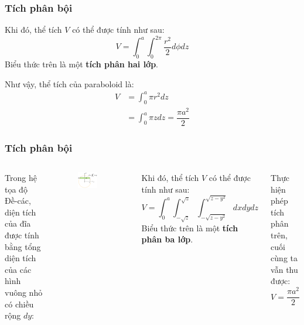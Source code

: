 \begin{frame}
\frametitle{Tích phân bội}
Khi đó, thể tích \(V\) có thể được tính như sau:
\begin{equation}
    V= \int_0^a \int_0^{2\pi} \dfrac{r^2}{2} d\phi dz
\end{equation}
Biểu thức trên là một \textbf{tích phân hai lớp}.

Như vậy, thể tích của paraboloid là:
\begin{equation}
    \begin{aligned}
    V&= \int_0^a \pi r^2 dz\\
    &= \int_0^a \pi z dz = \boxed{\dfrac{\pi a^2}{2}}
    \end{aligned}
\end{equation}
\end{frame}

\begin{frame}
\frametitle{Tích phân bội}
\begin{columns}
Trong hệ tọa độ Đề-các, diện tích của đĩa được tính bằng tổng diện tích của các hình vuông nhỏ có chiều rộng \(dy\):
\begin{figure}
    \centering
    \includegraphics[width=0.7\textwidth]{Content/Figure/descartesdisc.png}
\end{figure}
Khi đó, thể tích \(V\) có thể được tính như sau:
\begin{equation}
    V= \int_0^a \int_{-\sqrt{z}}^{\sqrt{z}} \int_{-\sqrt{z-y^2}}^{\sqrt{z-y^2}} dx dy dz
\end{equation}
Biểu thức trên là một \textbf{tích phân ba lớp}.

Thực hiện phép tích phân trên, cuối cùng ta vẫn thu được:
\begin{equation}
    V = \boxed{\dfrac{\pi a^2}{2}}
\end{equation}
\end{columns}
\end{frame}

